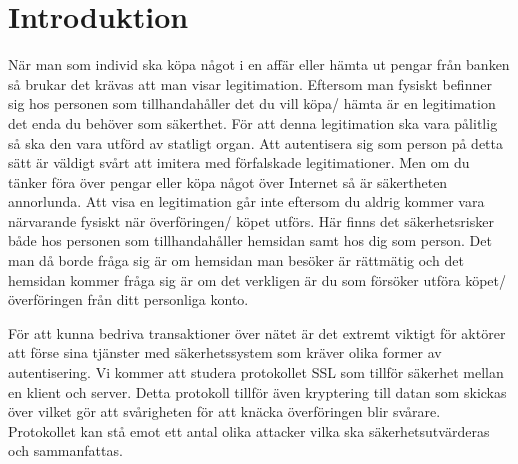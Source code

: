 \section{Introduktion}

När man som individ ska köpa något i en affär eller hämta ut pengar från banken så brukar det krävas att man visar legitimation. Eftersom man fysiskt befinner sig hos personen som tillhandahåller det du vill köpa/ hämta är en legitimation det enda du behöver som säkerthet. För att denna legitimation ska vara pålitlig så ska den vara utförd av statligt organ. Att autentisera sig som person på detta sätt är väldigt svårt att imitera med förfalskade legitimationer. Men om du tänker föra över pengar eller köpa något över Internet så är säkertheten annorlunda. Att visa en legitimation går inte eftersom du aldrig kommer vara närvarande fysiskt när överföringen/ köpet utförs. Här finns det säkerhetsrisker både hos personen som tillhandahåller hemsidan samt hos dig som person. Det man då borde fråga sig är om hemsidan man besöker är rättmätig och det hemsidan kommer fråga sig är om det verkligen är du som försöker utföra köpet/ överföringen från ditt personliga konto.

För att kunna bedriva transaktioner över nätet är det extremt viktigt för aktörer att förse sina tjänster med säkerhetssystem som kräver olika former av autentisering. Vi kommer att studera protokollet SSL som tillför säkerhet mellan en klient och server. Detta protokoll tillför även kryptering till datan som skickas över vilket gör att svårigheten för att knäcka överföringen blir svårare. Protokollet kan stå emot ett antal olika attacker vilka ska säkerhetsutvärderas och sammanfattas. 
